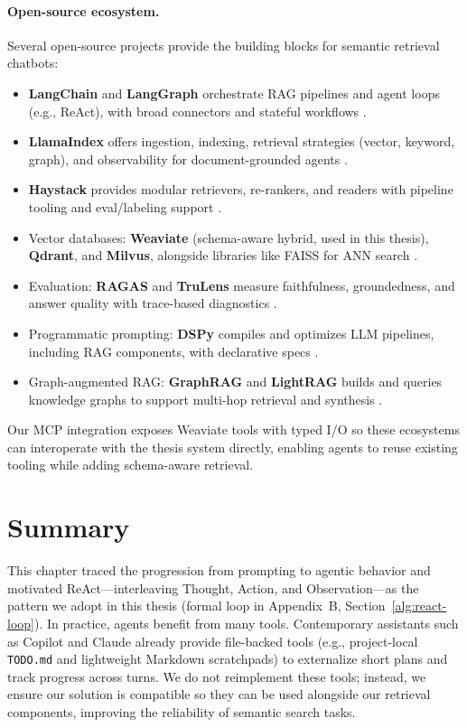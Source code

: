 \paragraph{Open-source ecosystem.} Several open-source projects provide the building blocks for semantic retrieval chatbots:
\begin{itemize}
    \item \textbf{LangChain} and \textbf{LangGraph} orchestrate RAG pipelines and agent loops (e.g., ReAct), with broad connectors and stateful workflows \cite{langchain,langgraph}.
    \item \textbf{LlamaIndex} offers ingestion, indexing, retrieval strategies (vector, keyword, graph), and observability for document-grounded agents \cite{llamaindex}.
    \item \textbf{Haystack} provides modular retrievers, re-rankers, and readers with pipeline tooling and eval/labeling support \cite{haystack}.
    \item Vector databases: \textbf{Weaviate} (schema-aware hybrid, used in this thesis), \textbf{Qdrant}, and \textbf{Milvus}, alongside libraries like FAISS for ANN search \cite{weaviate,qdrant,milvus,douze2024faiss}.
    \item Evaluation: \textbf{RAGAS} and \textbf{TruLens} measure faithfulness, groundedness, and answer quality with trace-based diagnostics \cite{ragas,trulens}.
    \item Programmatic prompting: \textbf{DSPy} compiles and optimizes LLM pipelines, including RAG components, with declarative specs \cite{dspy}.
    \item Graph-augmented RAG: \textbf{GraphRAG} and \textbf{LightRAG} builds and queries knowledge graphs to support multi-hop retrieval and synthesis \cite{graphrag}.
\end{itemize}

Our MCP integration exposes Weaviate tools with typed I/O so these ecosystems can interoperate with the thesis system directly, enabling agents to reuse existing tooling while adding schema-aware retrieval.

\section{Summary}
This chapter traced the progression from prompting to agentic behavior and motivated ReAct—interleaving Thought, Action, and Observation—as the pattern we adopt in this thesis (formal loop in Appendix~B, Section~\ref{alg:react-loop}). In practice, agents benefit from many tools. Contemporary assistants such as Copilot and Claude already provide file-backed tools (e.g., project-local \texttt{TODO.md} and lightweight Markdown scratchpads) to externalize short plans and track progress across turns. We do not reimplement these tools; instead, we ensure our solution is compatible so they can be used alongside our retrieval components, improving the reliability of semantic search tasks.

